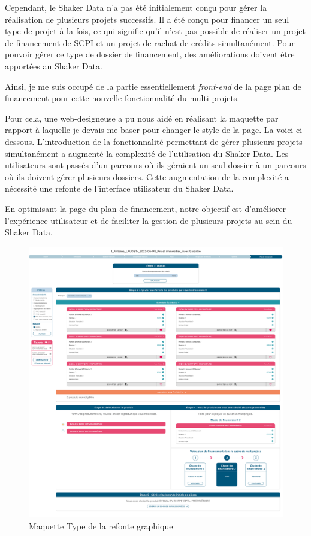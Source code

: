 \documentclass[12pt,oneside,noprintercorrection]{iut}
\begin{document}
Cependant, le Shaker Data n'a pas été initialement conçu pour gérer la réalisation de plusieurs projets successifs. Il a été conçu pour financer un seul type de projet à la fois, ce qui signifie qu'il n'est pas possible de réaliser un projet de financement de SCPI et un projet de rachat de crédits simultanément. Pour pouvoir gérer ce type de dossier de financement, des améliorations doivent être apportées au Shaker Data.

Ainsi, je me suis occupé de la partie essentiellement \textit{front-end} de la page plan de financement pour cette nouvelle fonctionnalité du multi-projets.

Pour cela, une web-designeuse a pu nous aidé en réalisant la maquette par rapport à laquelle je devais me baser pour changer le style de la page. 
La voici ci-dessous.
L'introduction de la fonctionnalité permettant de gérer plusieurs projets simultanément a augmenté la complexité de l'utilisation du Shaker Data. Les utilisateurs sont passés d'un parcours où ils géraient un seul dossier à un parcours où ils doivent gérer plusieurs dossiers. Cette augmentation de la complexité a nécessité une refonte de l'interface utilisateur du Shaker Data.

En optimisant la page du plan de financement, notre objectif est d'améliorer l'expérience utilisateur et de faciliter la gestion de plusieurs projets au sein du Shaker Data.
\begin{figure}[!ht]
  \centering
  \includegraphics[width=15cm]{img/page1Maquette-1.png}
  \caption{Maquette Type de la refonte graphique}
\end{figure}
\end{document}
